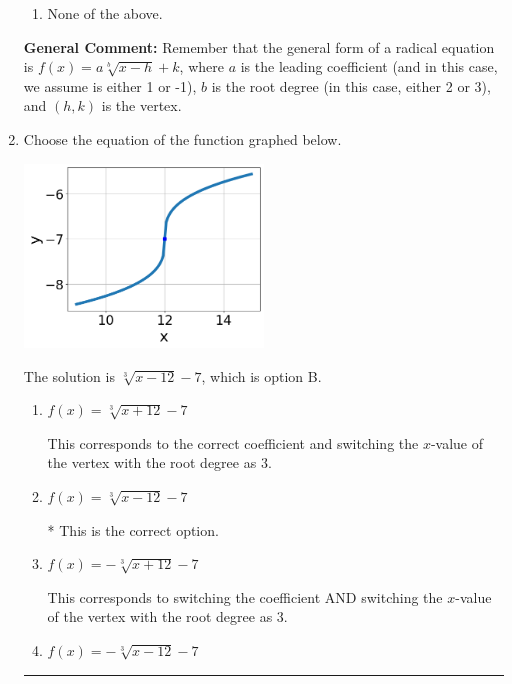 \documentclass{extbook}[14pt]
\newcommand{\litem}[1]{\item #1

\rule{\textwidth}{0.4pt}}
\begin{document}
\begin{enumerate}
{\begin{enumerate}[label=\Alph*.]
\item None of the above.\end{enumerate}
\textbf{General Comment:} Remember that the general form of a radical equation is $ f(x) = a \sqrt[b]{x - h} + k $, where $a$ is the leading coefficient (and in this case, we assume is either 1 or -1), $b$ is the root degree (in this case, either 2 or 3), and $(h, k)$ is the vertex.
}
\litem{
Choose the equation of the function graphed below.

\begin{center}
    \includegraphics[width=0.5\textwidth]{../Figures/radicalGraphToEquationB.png}
\end{center}


The solution is \( \sqrt[3]{x - 12} - 7 \), which is option B.\begin{enumerate}[label=\Alph*.]
\item \( f(x) = \sqrt[3]{x + 12} - 7 \)

This corresponds to the correct coefficient and switching the $x$-value of the vertex with the root degree as $3$.
\item \( f(x) = \sqrt[3]{x - 12} - 7 \)

* This is the correct option.
\item \( f(x) = - \sqrt[3]{x + 12} - 7 \)

This corresponds to switching the coefficient AND switching the $x$-value of the vertex with the root degree as $3$.
\item \( f(x) = - \sqrt[3]{x - 12} - 7 \)


\end{enumerate}}
\end{enumerate}
\end{document}
